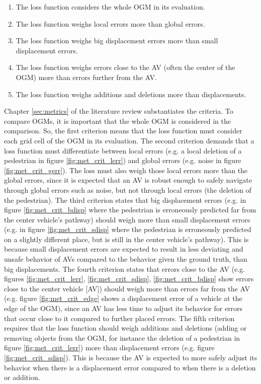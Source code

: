 \begin{enumerate}
	\item The loss function considers the whole \gls{OGM} in its evaluation.
	\item The loss function weighs local errors more than global errors.
	\item The loss function weighs big displacement errors more than small displacement errors. 
	\item The loss function weighs errors close to the \gls{AV} (often the center of the \gls{OGM}) more than errors further from the \gls{AV}.
	\item The loss function weighs additions and deletions more than displacements.
\end{enumerate}

Chapter \ref{sec:metrics} of the literature review substantiates the criteria. To compare \glspl{OGM}, it is important that the whole \gls{OGM} is considered in the comparison. So, the first criterion means that the loss function must consider each grid cell of the \gls{OGM} in its evaluation. The second criterion demands that a loss function must differentiate between local errors (e.g. a local deletion of a pedestrian in figure \ref{fig:met_crit_lerr}) and global errors (e.g. noise in figure \ref{fig:met_crit_gerr}). The loss must also weigh those local errors more than the global errors, since it is expected that an \gls{AV} is robust enough to safely navigate through global errors such as noise, but not through local errors (the deletion of the pedestrian). The third criterion states that big displacement errors (e.g. in figure \ref{fig:met_crit_bdisp} where the pedestrian is erroneously predicted far from the center vehicle's pathway) should weigh more than small displacement errors (e.g. in figure \ref{fig:met_crit_sdisp} where the pedestrian is erroneously predicted on a slightly different place, but is still in the center vehicle's pathway). This is because small displacement errors are expected to result in less deviating and unsafe behavior of \glspl{AV} compared to the behavior given the ground truth, than big displacements. The fourth criterion states that errors close to the \gls{AV} (e.g. figures \ref{fig:met_crit_lerr}, \ref{fig:met_crit_sdisp}, \ref{fig:met_crit_bdisp} show errors close to the center vehicle [\gls{AV}]) should weigh more than errors far from the \gls{AV} (e.g. figure \ref{fig:met_crit_edge} shows a displacement error of a vehicle at the edge of the \gls{OGM}), since an \gls{AV} has less time to adjust its behavior for errors that occur close to it compared to further placed errors. The fifth criterion requires that the loss function should weigh additions and deletions (adding or removing objects from the \gls{OGM}, for instance the deletion of a pedestrian in figure \ref{fig:met_crit_lerr}) more than displacement errors (e.g. figure \ref{fig:met_crit_sdisp}). This is because the \gls{AV} is expected to more safely adjust its behavior when there is a displacement error compared to when there is a deletion or addition. \\

